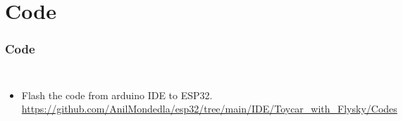 \documentclass{beamer}
\begin{document}
\section{Code}
\begin{frame}
\frametitle{Code}
\begin{columns}

  \begin{itemize}
  \item  Flash the code from arduino IDE to ESP32.\\
  \url{https://github.com/AnilMondedla/esp32/tree/main/IDE/Toycar_with_Flysky/Codes}
  
  
  \end{itemize}
  \  
\end{columns}



\end{frame}
\end{document}
